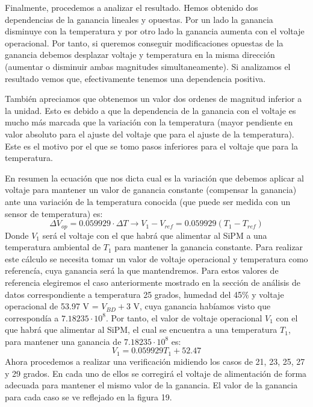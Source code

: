 Finalmente, procedemos a analizar el resultado. Hemos obtenido dos dependencias de la ganancia lineales y opuestas. Por un lado la ganancia disminuye con la temperatura y por otro lado la ganancia aumenta con el voltaje operacional. Por tanto, si queremos conseguir modificaciones opuestas de la ganancia debemos desplazar voltaje y temperatura en la misma dirección (aumentar o disminuir ambas magnitudes simultaneamente). Si analizamos el resultado vemos que, efectivamente tenemos una dependencia positiva.

También apreciamos que obtenemos un valor dos ordenes de magnitud inferior a la unidad. Esto es debido a que la dependencia de la ganancia con el voltaje es mucho más marcada que la variación con la temperatura (mayor pendiente en valor absoluto para el ajuste del voltaje que para el ajuste de la temperatura). Este es el motivo por el que se tomo pasos inferiores para el voltaje que para la temperatura. 

En resumen la ecuación que nos dicta cual es la variación que debemos aplicar al voltaje para mantener un valor de ganancia constante (compensar la ganancia) ante una variación de la temperatura conocida (que puede ser medida con un sensor de temperatura) es:
\begin{equation}
\Delta V_{op}=0.059929 \cdot \Delta T \longrightarrow V_1-V_{ref}=0.059929(T_1-T_{ref})
\label{compensacionfinal}
\end{equation}
Donde $V_1$ será el voltaje con el que habrá que alimentar al SiPM a una temperatura ambiental de $T_1$ para mantener la ganancia constante. Para realizar este cálculo se necesita tomar un valor de voltaje operacional y temperatura como referencía, cuya ganancia será la que mantendremos. Para estos valores de referencia elegiremos el caso anteriormente mostrado en la sección de análisis de datos correspondiente a temperatura 25 grados, humedad del 45\% y voltaje operacional de 53.97 V = $V_{BD}+ 3$ V, cuya ganancia habíamos visto que correspondía a $7.18235 \cdot 10^8$. Por tanto, el valor de voltaje operacional $V_1$ con el que habrá que alimentar al SiPM, el cual se encuentra a una temperatura $T_1$, para mantener una ganancia de $7.18235 \cdot 10^8$ es:
\begin{equation}
V_1=0.059929T_1+52.47
\label{compensacionfinal}
\end{equation}
Ahora procedemos a realizar una verificación midiendo los casos de 21, 23, 25, 27 y 29 grados. En cada uno de ellos se corregirá el voltaje de alimentación de forma adecuada para mantener el mismo valor de la ganancia. El valor de la ganancia para cada caso se ve reflejado en la figura 19. 

